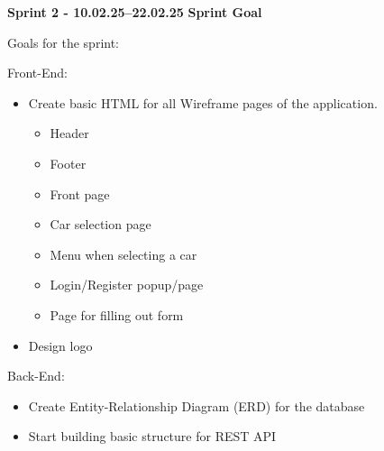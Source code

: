 \documentclass{article}
\begin{document}
\textbf{Sprint 2 - 10.02.25–22.02.25} 
\textbf{Sprint Goal} 

Goals for the sprint:

Front-End:
\begin{itemize}
    \item Create basic HTML for all Wireframe pages of the application.
    \begin{itemize}
        \item Header
        \item Footer
        \item Front page
        \item Car selection page
        \item Menu when selecting a car
        \item Login/Register popup/page
        \item Page for filling out form 
    \end{itemize}
    \item Design logo
\end{itemize}

Back-End:
\begin{itemize}
    \item Create Entity-Relationship Diagram (ERD) for the database
    \item Start building basic structure for REST API
\end{itemize}
\end{document}
